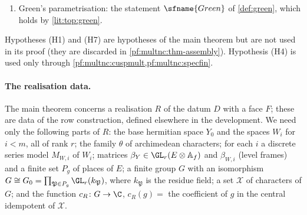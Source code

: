 \begin{hypothesis}
\begin{enumerate}[label=(H\arabic*)]
Zelevinsky and the corresponding cell semisimplification \cite{BernsteinZelevinsky1977}.
\item Green's parametrisation: the statement $\sfname{Green}$ of \cref{def:green}, which holds by \cref{lit:top:green}.
\end{enumerate}
\end{hypothesis}

\begin{remark}\label{pf:multnc:rem-unused}
Hypotheses (H1) and (H7) are hypotheses of the main theorem but are not used in its proof (they are discarded in
\cref{pf:multnc:thm-assembly}). Hypothesis (H4) is used only through \cref{pf:multnc:cuspmult,pf:multnc:specfin}.
\end{remark}

\paragraph{The realisation data.} The main theorem concerns a realisation $R$ of the datum $D$ with a face $F$; these are
data of the row construction, defined elsewhere in the development. We need only the following parts of $R$: the base
hermitian space $Y_0$ and the spaces $W_i$ for $i<m$, all of rank $r$; the family $\theta$ of archimedean characters;
for each $i$ a discrete series model $M_{W,i}$ of $W_i$; matrices $\beta_{Y}\in\GL_r(E\otimes\multncAf)$ and
$\beta_{W,i}$ (level frames) and a finite set $P_g$ of places of $E$; a finite group $G$ with an isomorphism
$G\cong G_0=\prod_{\mathfrak P\in P_g}\GL_r(k_{\mathfrak P})$, where $k_{\mathfrak P}$ is the residue field; a set
$\mathcal X$ of characters of $G$; and the function $c_R\colon G\to\C$, $c_R(g)=$ the coefficient of $g$ in the central
idempotent of $\mathcal X$.

